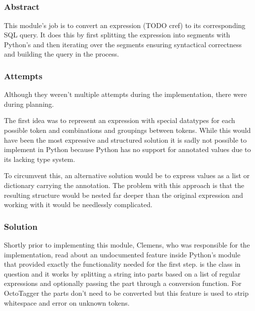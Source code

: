 \subsection{}
\def\kapitelautor{Clemens Stadlbauer}
\label{subsec:mod:expression}

\subsubsection{Abstract}

This module's job is to convert an expression (TODO cref) to its corresponding
SQL query. It does this by first splitting the expression into segments with
Python's  and then iterating over the segments ensuring
syntactical correctness and building the query in the process.

\subsubsection{Attempts}

Although they weren't multiple attempts during the implementation, there were
during planning.

The first idea was to represent an expression with special datatypes for each
possible token and combinations and groupings between tokens. While this would
have been the most expressive and structured solution it is sadly not possible
to implement in Python because Python has no support for annotated values due
to its lacking type system.

To circumvent this, an alternative solution would be to express values as a
list or dictionary carrying the annotation. The problem with this approach is
that the resulting structure would be nested far deeper than the original
expression and working with it would be needlessly complicated.

\subsubsection{Solution} %

Shortly prior to implementing this module, Clemens, who was responsible for the
implementation, read about an undocumented feature inside Python's 
module that provided exactly the functionality needed for the first step.
 is the class in question and it works by splitting a string
into parts based on a list of regular expressions and optionally passing the
part through a conversion function. For OctoTagger the parts don't need to be
converted but this feature is used to strip whitespace and error on unknown
tokens.

